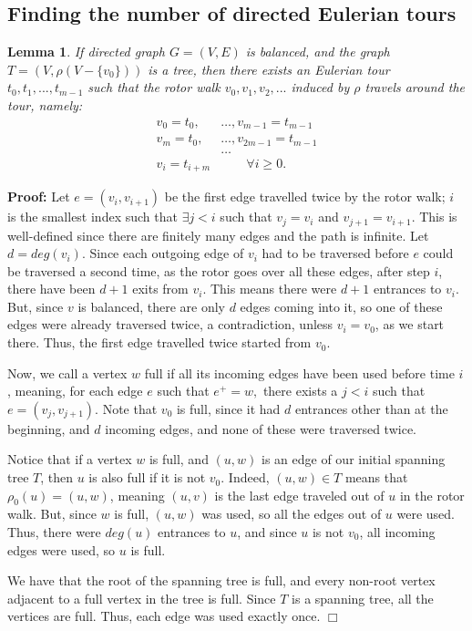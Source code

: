 \documentclass[11pt]{article}
\newtheorem{lemma}[theorem]{Lemma}
\newenvironment{proof}{\noindent \textbf{Proof:}}{$\Box$}
\begin{document}
\subsection{Finding the number of directed Eulerian tours}

\begin{lemma}
	If directed graph $G=(V,E)$ is balanced, and the graph $T=(V, \rho(V-\{v_0\}))$ is a tree, then there exists an Eulerian tour $t_0, t_1, ..., t_{m-1}$ such that the rotor walk $v_0, v_1, v_2, ...$ induced by $\rho$ travels around the tour, namely:
	\begin{align*} v_0=t_0,&\ldots,v_{m-1}=t_{m-1} \\ v_m=t_0, &\ldots, v_{2m-1}=t_{m-1} \\ &\ldots \\  v_{i} = t_{i+m} &\qquad \forall i \geq 0. \end{align*}
\end{lemma}

\begin{proof}
	Let $e=(v_i,v_{i+1})$ be the first edge travelled twice by the rotor walk; $i$ is the smallest index such that $\exists j<i$ such 	that $v_j=v_i$ and $v_{j+1}=v_{i+1}.$ This is well-defined since there are finitely many edges and the path is infinite. Let 				$d=deg(v_i)$. Since each outgoing edge of $v_i$ had to be traversed before $e$ could be traversed a second time, as the rotor goes 	 over all these edges, after step $i$, there have been $d+1$ exits from $v_i$. This means there were $d+1$ entrances to $v_i$. But, 	since $v$ is balanced, there are only $d$ edges coming into it, so one of these edges were already traversed twice, a 							contradiction, unless $v_i=v_0$, as we start there. Thus, the first edge travelled twice started from $v_0$.
	
	Now, we call a vertex $w$ full if all its incoming edges have been used before time $i$, meaning, for each edge $e$ such that 			$e^+=w,$ there exists a $j<i$ such that $e=(v_j,v_{j+1})$. Note that $v_0$ is full, since it had $d$ entrances other than at the 	 	 beginning, and $d$ incoming edges, and none of these were traversed twice.
	
	Notice that if a vertex $w$ is full, and $(u,w)$ is an edge of our initial spanning tree $T$, then $u$ is also full if it is not 		$v_0$. Indeed, $(u,w) \in T$ means that $\rho_0(u)=(u,w)$, meaning $(u,v)$ is the last edge traveled out of $u$ in the rotor walk. 	 But, since $w$ is full, $(u,w)$ was used, so all the edges out of $u$ were used. Thus, there were $deg(u)$ entrances to $u$, and 		since $u$ is not $v_0$, all incoming edges were used, so $u$ is full.
	
	We have that the root of the spanning tree is full, and every non-root vertex adjacent to a full vertex in the tree is full. Since 	 $T$ is a spanning tree, all the vertices are full. Thus, each edge was used exactly once.
\end{proof}
\end{document}
